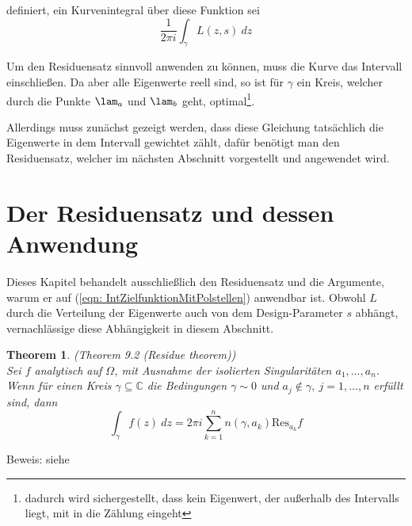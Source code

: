 \documentclass[a4paper,12pt]{report}
\newcommand{\C}{\mathbb C}
\newcommand{\1}{\mathds{1}}
\newcommand{\Res}{\text{Res}}
\theoremstyle{plain} %
\newtheorem{theorem}{Theorem}
\theoremstyle{definition} %
\theoremstyle{remark}
\begin{document}
            definiert, ein Kurvenintegral über diese Funktion sei
            \begin{equation}
                  \label{eqn: IntZielfunktionMitPolstellen}
                  \frac{1}{2\pi i}\int_\gamma L(z, s)\ dz
            \end{equation}

            Um den Residuensatz sinnvoll anwenden zu können, muss die Kurve \gamm das Intervall \lamAlamB einschließen.
            Da aber alle Eigenwerte reell sind, so ist für $\gamma$ ein Kreis, welcher durch die Punkte $\lam_a$ und $\lam_b$ geht, optimal\footnote{dadurch wird sichergestellt,
            dass kein Eigenwert, der außerhalb des Intervalls \lamAlamB liegt, mit in die Zählung eingeht}.

            Allerdings muss zunächst gezeigt werden, dass diese Gleichung tatsächlich die Eigenwerte in dem Intervall gewichtet zählt, dafür benötigt man den Residuensatz,
            welcher im nächsten Abschnitt vorgestellt und angewendet wird.

      \section{Der Residuensatz und dessen Anwendung}
            Dieses Kapitel behandelt ausschließlich den Residuensatz und die Argumente, warum er auf (\ref{eqn: IntZielfunktionMitPolstellen}) anwendbar ist.
            Obwohl $L$ durch die Verteilung der Eigenwerte auch von dem Design-Parameter $s$ abhängt, vernachlässige diese Abhängigkeit in diesem Abschnitt.

            \begin{theorem}(Theorem 9.2 (Residue theorem)\cite[S. 141]{complexAnalysis})\\
                  \label{thrm: Residuensatz}
                  Sei $f$ analytisch auf $\Omega$, mit Ausnahme der isolierten Singularitäten $a_1,\dots,a_n$. Wenn für einen Kreis $\gamma\subseteq\C$
                  die Bedingungen $\gamma \sim 0$ und $a_j\notin \gamma,\ j=1,\dots,n$ erfüllt sind, dann
                  $$\int_\gamma f(z)\ dz = 2\pi i\sum_{k=1}^{n} n(\gamma, a_k)\Res_{a_k}f$$
            \end{theorem}
            Beweis: siehe \cite[S. 142]{complexAnalysis}
\end{document}
